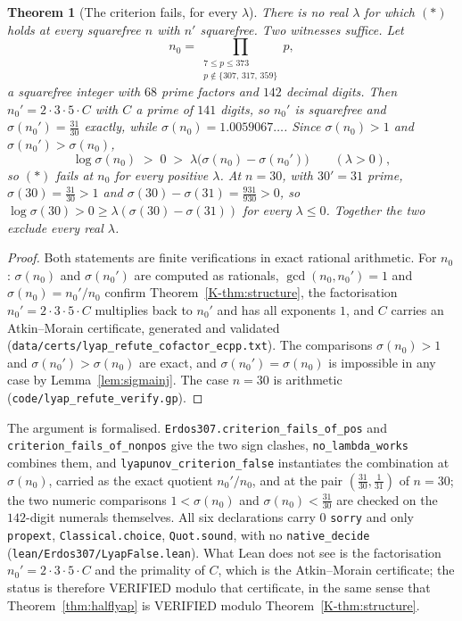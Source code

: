 \documentclass[11pt]{article}
\newtheorem{theorem}{Theorem}[section]
\theoremstyle{definition}
\begin{document}
\begin{theorem}[The criterion fails, for every $\lambda$]\label{thm:lyapfalse}
There is no real $\lambda$ for which $(\ast)$ holds at every squarefree $n$ with $n'$ squarefree.
Two witnesses suffice. Let
\[ n_0=\!\!\!\prod_{\substack{7\le p\le373\\ p\notin\{307,\,317,\,359\}}}\!\!\!p, \]
a squarefree integer with $68$ prime factors and $142$ decimal digits. Then $n_0'=2\cdot3\cdot5\cdot C$
with $C$ a prime of $141$ digits, so $n_0'$ is squarefree and $\sigma(n_0')=\tfrac{31}{30}$ exactly,
while $\sigma(n_0)=1.0059067\ldots$. Since $\sigma(n_0)>1$ and $\sigma(n_0')>\sigma(n_0)$,
\[ \log\sigma(n_0)\;>\;0\;>\;\lambda\bigl(\sigma(n_0)-\sigma(n_0')\bigr)\qquad(\lambda>0), \]
so $(\ast)$ fails at $n_0$ for every positive $\lambda$. At $n=30$, with $30'=31$ prime,
$\sigma(30)=\tfrac{31}{30}>1$ and $\sigma(30)-\sigma(31)=\tfrac{931}{930}>0$, so $\log\sigma(30)>0\ge
\lambda(\sigma(30)-\sigma(31))$ for every $\lambda\le0$. Together the two exclude every real
$\lambda$.
\end{theorem}
\begin{proof}
Both statements are finite verifications in exact rational arithmetic. For $n_0$: $\sigma(n_0)$ and
$\sigma(n_0')$ are computed as rationals, $\gcd(n_0,n_0')=1$ and $\sigma(n_0)=n_0'/n_0$ confirm
Theorem~\ref{K-thm:structure}, the factorisation $n_0'=2\cdot3\cdot5\cdot C$ multiplies back to $n_0'$
and has all exponents $1$, and $C$ carries an Atkin--Morain certificate, generated and validated
\textup{(\texttt{data/certs/lyap\_refute\_cofactor\_ecpp.txt})}. The comparisons $\sigma(n_0)>1$ and
$\sigma(n_0')>\sigma(n_0)$ are exact, and $\sigma(n_0')=\sigma(n_0)$ is impossible in any case by
Lemma~\ref{lem:sigmainj}. The case $n=30$ is arithmetic
\textup{(\texttt{code/lyap\_refute\_verify.gp})}.
\end{proof}

The argument is formalised. \texttt{Erdos307.criterion\_fails\_of\_pos} and
\texttt{criterion\_fails\_of\_nonpos} give the two sign clashes,
\texttt{no\_lambda\_works} combines them, and \texttt{lyapunov\_criterion\_false} instantiates the
combination at $\sigma(n_0)$, carried as the exact quotient $n_0'/n_0$, and at the pair
$(\tfrac{31}{30},\tfrac1{31})$ of $n=30$; the two numeric comparisons $1<\sigma(n_0)$ and
$\sigma(n_0)<\tfrac{31}{30}$ are checked on the $142$-digit numerals themselves. All six
declarations carry $0$ \texttt{sorry} and only \texttt{propext}, \texttt{Classical.choice},
\texttt{Quot.sound}, with no \texttt{native\_decide}
\textup{(\texttt{lean/Erdos307/LyapFalse.lean})}. What Lean does not see is the factorisation
$n_0'=2\cdot3\cdot5\cdot C$ and the primality of $C$, which is the Atkin--Morain certificate; the
status is therefore \textup{VERIFIED} modulo that certificate, in the same sense that
Theorem~\ref{thm:halflyap} is \textup{VERIFIED} modulo Theorem~\ref{K-thm:structure}.
\end{document}
